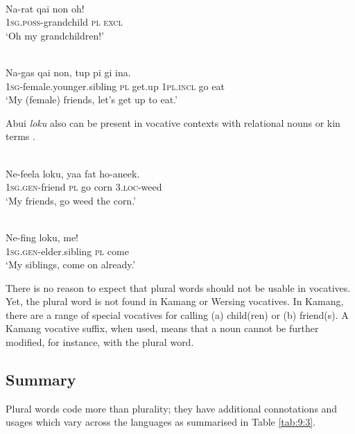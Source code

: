 \ea%
\label{ex:9:89}
 \\
\gll Na-{rat qai} non oh!  \\
  1\textsc{sg}.\textsc{poss}-grandchild \textsc{pl} \textsc{excl}   \\
\glt `Oh my grandchildren!'
\z







\ea%
\label{ex:9:90}
 \\
\gll  Na-{gas qai} non, tup pi gi ina. \\
   \textsc{1sg-}female.younger.sibling \textsc{pl} get.up \textsc{1pl.incl} go eat  \\
\glt `My (female) friends, let's get up to eat.'
\z






Abui \textit{loku} also can be present in vocative contexts with relational nouns  or kin terms .


\ea%
\label{ex:9:91}
 \\
\gll  Ne-feela loku, yaa fat ho-aneek.\\
   \textsc{1sg.gen-}friend \textsc{pl} go corn \textsc{3.loc}-weed \\
\glt `My friends, go weed the corn.'
\z







\ea%
\label{ex:9:92}
 \\
\gll  Ne-fing loku, me! \\
    \textsc{1sg.gen-}elder.sibling \textsc{pl} come \\
\glt `My siblings, come on already.'
\z






There is no reason to expect that plural words should not be usable in vocatives. Yet, the plural word is not found in Kamang or Wersing vocatives. In Kamang, there are a range of special vocatives for calling (a) child(ren) or (b) friend(s). A Kamang vocative suffix, when used, means that a noun cannot be further modified, for instance, with the plural word.

\subsection{Summary}  %
\label{sec:9:4.6}
Plural words code more than plurality; they have additional connotations and usages which vary across the languages as summarised in Table \ref{tab:9:3}.

